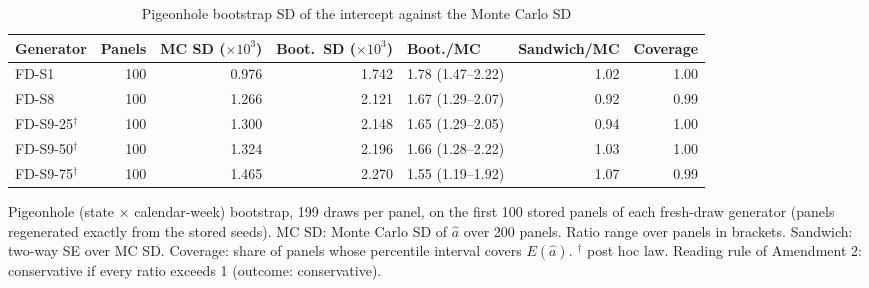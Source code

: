 \begin{table}[!tbp]
\centering
\scriptsize\renewcommand{\arraystretch}{1.15}
\setlength{\tabcolsep}{3pt}
\caption{Pigeonhole bootstrap SD of the intercept against the Monte Carlo SD}
\label{tab:r2-bootstrap-sd}
\begin{tabularx}{\linewidth}{@{}Xrrrlrr@{}}
\toprule
Generator & Panels & MC SD ($\times10^3$) & Boot.\ SD ($\times10^3$) & Boot./MC & Sandwich/MC & Coverage \\
\midrule
FD-S1 & 100 & 0.976 & 1.742 & 1.78 (1.47--2.22) & 1.02 & 1.00 \\
FD-S8 & 100 & 1.266 & 2.121 & 1.67 (1.29--2.07) & 0.92 & 0.99 \\
FD-S9-25$^\dagger$ & 100 & 1.300 & 2.148 & 1.65 (1.29--2.05) & 0.94 & 1.00 \\
FD-S9-50$^\dagger$ & 100 & 1.324 & 2.196 & 1.66 (1.28--2.22) & 1.03 & 1.00 \\
FD-S9-75$^\dagger$ & 100 & 1.465 & 2.270 & 1.55 (1.19--1.92) & 1.07 & 0.99 \\
\bottomrule
\end{tabularx}
\par\smallskip\parbox{\linewidth}{\scriptsize\linespread{1.15}\selectfont Pigeonhole (state $\times$ calendar-week) bootstrap, 199 draws per panel, on the first 100 stored panels of each fresh-draw generator (panels regenerated exactly from the stored seeds). MC SD: Monte Carlo SD of $\hat a$ over 200 panels. Ratio range over panels in brackets. Sandwich: two-way SE over MC SD. Coverage: share of panels whose percentile interval covers $E(\hat a)$. $^\dagger$ post hoc law. Reading rule of Amendment 2: conservative if every ratio exceeds 1 (outcome: conservative).}
\end{table}
